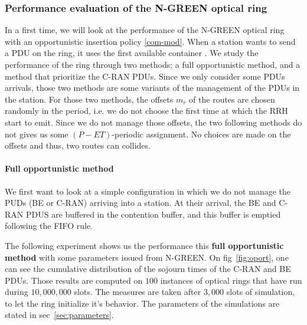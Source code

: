 \documentclass[a4paper,10pt,english]{article}
\begin{document}
   \subsubsection{Performance evaluation of the N-GREEN optical ring}
   \label{sec:oportmethods}
   In a first time, we will look at the performance of the N-GREEN optical ring with an opportunistic insertion policy \ref{com-mod}. When a station wants to send a PDU on the ring, it uses the first available container .
    We study the performance of the ring through two methods; a full opportunistic method, and a method that prioritize the C-RAN PDUs. Since we only consider some PDUs arrivals, those two methods are some variants of the management of the PDUs in the station.
   For those two methods, the offsets $m_r$ of the routes are chosen randomly in the period, i.e. we do not choose the first time at which the RRH start to emit.
   Since we do not manage those offsets, the two following methods do not gives us some $(P-ET)$-periodic assignment. No choices are made on the offsets and thus, two routes can collides. 

    
    \paragraph{Full opportunistic method}
    \label{sec:fullopport}
    We first want to look at a simple configuration in which we do not manage the PUDs (BE or C-RAN) arriving into a station. At their arrival, the BE and C-RAN PDUS are buffered in the contention buffer, and this buffer is emptied following the FIFO rule.

The following experiment shows us the performance this {\bf full opportunistic method} with some parameters issued from N-GREEN. 
On fig~\ref{fig:oport}, one can see the cumulative distribution of the sojourn times of the C-RAN and BE PDUs. Those results are computed on $100$ instances of optical rings that have run during $10,000,000$ slots. The measures are taken after $3,000$ slots of simulation, to let the ring initialize it's behavior. The parameters of the simulations are stated in sec~\ref{sec:parameters}.
\end{document}
